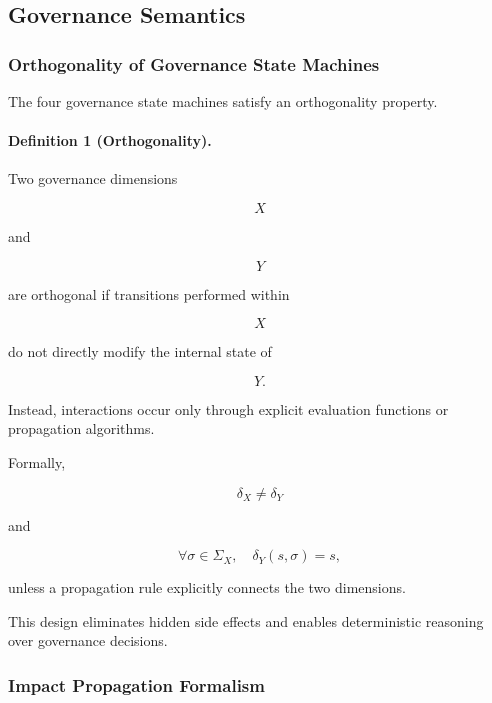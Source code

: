 \documentclass[10pt]{article}
\begin{document}
\subsection{Governance Semantics}
\subsubsection{Orthogonality of Governance State Machines}
\label{appendix:governance_orthogonality}
The four governance state machines satisfy an orthogonality property.

\paragraph{Definition 1 (Orthogonality).}

Two governance dimensions

\[
X
\]

and

\[
Y
\]

are orthogonal if transitions performed within

\[
X
\]

do not directly modify the internal state of

\[
Y.
\]

Instead, interactions occur only through explicit evaluation functions or
propagation algorithms.

Formally,

\begin{equation}
\delta_X
\neq
\delta_Y
\label{eq:app_orth1}
\end{equation}

and

\begin{equation}
\forall
\sigma
\in
\Sigma_X,
\quad
\delta_Y(s,\sigma)
=
s,
\label{eq:app_orth2}
\end{equation}

unless a propagation rule explicitly connects the two dimensions.

This design eliminates hidden side effects and enables deterministic reasoning
over governance decisions.

\subsubsection{Impact Propagation Formalism}
\label{appendix:impact_propagation}
\end{document}
